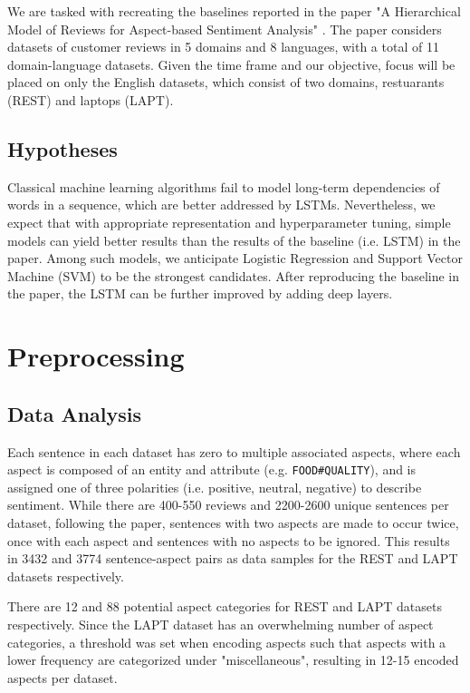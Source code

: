 \documentclass[comsoc,conference]{IEEEtran}
\begin{document}
We are tasked with recreating the baselines reported in the paper "A Hierarchical Model of Reviews for Aspect-based Sentiment Analysis" \cite{T1-P2}. The paper considers datasets of customer reviews in 5 domains and 8 languages, with a total of 11 domain-language datasets. Given the time frame and our objective, focus will be placed on only the English datasets, which consist of two domains, restuarants (REST) and laptops (LAPT). 

\subsection{Hypotheses}

Classical machine learning algorithms fail to model long-term dependencies of words in a sequence, which are better addressed by LSTMs. Nevertheless, we expect that with appropriate representation and hyperparameter tuning, simple models can yield better results than the results of the baseline (i.e. LSTM) in the paper. Among such models, we anticipate Logistic Regression and Support Vector Machine (SVM) to be the strongest candidates. After reproducing the baseline in the paper, the LSTM can be further improved by adding deep layers. 

\section{Preprocessing}

\subsection{Data Analysis}

Each sentence in each dataset has zero to multiple associated aspects, where each aspect is composed of an entity and attribute (e.g. \texttt{FOOD\#QUALITY}), and is assigned one of three polarities (i.e. positive, neutral, negative) to describe sentiment. While there are 400-550 reviews and 2200-2600 unique sentences per dataset, following the paper, sentences with two aspects are made to occur twice, once with each aspect and sentences with no aspects to be ignored. This results in 3432 and 3774 sentence-aspect pairs as data samples for the REST and LAPT datasets respectively.

There are 12 and 88 potential aspect categories for REST and LAPT datasets respectively. Since the LAPT dataset has an overwhelming number of aspect categories, a threshold was set when encoding aspects such that aspects with a lower frequency are categorized under "miscellaneous", resulting in 12-15 encoded aspects per dataset.
\end{document}
